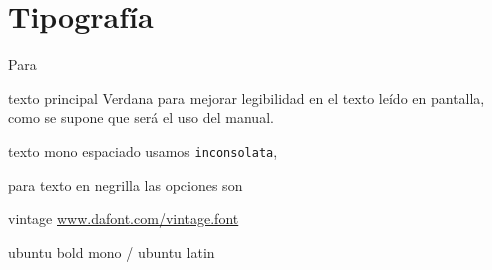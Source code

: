 \section*{Tipograf\'ia}


Para 


texto principal Verdana para mejorar legibilidad en el texto le\'ido en pantalla, como se supone que ser\'a el uso del manual. 

texto mono espaciado usamos \texttt{inconsolata}, 

para texto en negrilla las opciones son 

vintage \url{www.dafont.com/vintage.font}

ubuntu bold mono / ubuntu latin

